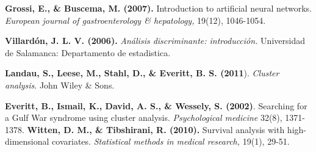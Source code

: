 \begin{thebibliography}{99}
\textbf{Grossi, E., \& Buscema, M. (2007). }Introduction to artificial neural networks. \emph{European journal of gastroenterology \& hepatology,} 19(12), 1046-1054.

\textbf{Villardón, J. L. V. (2006).} \emph{Análisis discriminante: introducción.} Universidad de Salamanca: Departamento de estadistica.

\textbf{Landau, S., Leese, M., Stahl, D., \& Everitt, B. S. (2011}). \emph{Cluster analysis}. John Wiley \& Sons.

 \textbf{Everitt, B., Ismail, K., David, A. S., \& Wessely, S. (2002)}. Searching for a Gulf War syndrome using cluster analysis. \emph{Psychological medicine} 32(8), 1371-1378.
\textbf{Witten, D. M., \& Tibshirani, R. (2010).} Survival analysis with high-dimensional covariates. \emph{Statistical methods in medical research,} 19(1), 29-51.
\end{thebibliography}
 